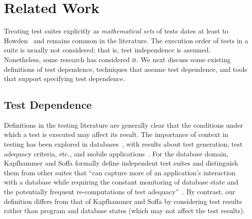 \section{Related Work}
\label{sec:related}



Treating test suites explicitly as \emph{mathematical sets} of tests dates at least
to Howden~\cite[p.~554]{howden:ToC:1975} and remains common in the literature.
The execution order of tests in a suite is usually not considered:
that is, test independence is assumed. Nonetheless,
some research has considered it. We next discuss some
existing definitions of test dependence, techniques that
assume test dependence, and tools that support specifying
test dependence.

\subsection{Test Dependence}

Definitions in the testing literature are generally clear that the
conditions under which a test is executed may affect its result. 
The
importance of context in testing has been explored 
in databases~\cite{Gray:1994:QGB:191843.191886,Chays:2000:FTD:347324.348954,
kapfhammeretal:FSE:2003}, with results about test
generation, test adequacy criteria, etc., and mobile
applications~\cite{Wang:2007:AGC}.
For the database domain, Kapfhammer and Soffa formally
define independent test suites and distinguish them from
other suites that ``can capture more of an application's
interaction with a database while requiring the constant monitoring of
database state and the potentially frequent re-computations of test
adequacy''~\cite[p.~101]{kapfhammeretal:FSE:2003}.
By contrast, our definition differs from that of Kapfhammer
and Soffa by considering
test results rather than program and database states
(which may not affect the test results).

